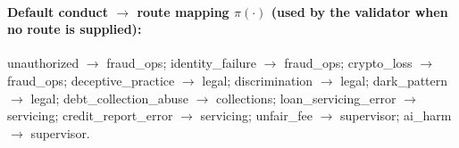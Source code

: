 \documentclass[11pt]{article}
\begin{document}
\paragraph{Default conduct $\to$ route mapping
$\pi(\cdot)$ (used by the validator when no route is supplied):}
unauthorized $\to$ fraud\_ops; identity\_failure $\to$ fraud\_ops;
crypto\_loss $\to$ fraud\_ops; deceptive\_practice $\to$ legal;
discrimination $\to$ legal; dark\_pattern $\to$ legal;
debt\_collection\_abuse $\to$ collections;
loan\_servicing\_error $\to$ servicing;
credit\_report\_error $\to$ servicing;
unfair\_fee $\to$ supervisor; ai\_harm $\to$ supervisor.



\end{document}
